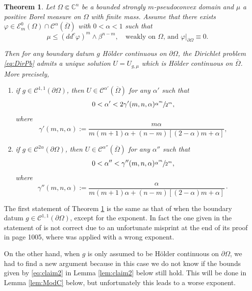\documentclass[11pt]{article}
\providecommand{\C}{}
\numberwithin{equation}{section}
\theoremstyle{definition}
\renewcommand{\C}{\mathbb{C}}
\theoremstyle{plain}
\newtheorem{theoremB}{Theorem}
\theoremstyle{definition}
\begin{document}
\begin{theoremB}\label{th:B'}
Let $\Omega \Subset \C^n$ be a bounded strongly $m$-pseudoconvex domain and $\mu $ a positive Borel measure on $\Omega$ with finite mass. Assume that there exists \hbox{$\varphi\in \mathcal{E}^0_m(\Omega)\cap\mathcal{C}^{\alpha}(\overline\Omega)$} with $0 < \alpha < 1$ such that
\begin{equation} \label{eq:subsol}
\mu \leq (dd^c\varphi)^m\wedge\beta^{n-m}, \quad \text{weakly on $\Omega$, and $\varphi|_{\partial \Omega} \equiv 0$.}
\end{equation}

Then for any boundary datum $g $ Hölder continuous on $\partial \Omega$, the Dirichlet problem \eqref{eq:DirPb} admits a unique solution $U = U_{g,\mu} $ which is Hölder continuous on $\bar{\Omega}$.
More precisely,
\begin{enumerate}
\item
if $g \in \mathcal C^{1,1} (\partial \Omega)$, then $ U \in \mathcal{C}^{\alpha'}(\overline\Omega)$ for any $\alpha'$ such that
\[
0 < \alpha' < 2 \gamma' (m,n,\alpha) \sfrac{\alpha^m}{2^{m}},
\]
where
\begin{equation} \label{eq:gamma'}
\gamma' (m,n,\alpha) := \frac{ m \alpha}{ m (m + 1) \alpha + (n-m) [(2 - \alpha)m + \alpha]},
\end{equation}

\item
if $g \in \mathcal C^{2 \alpha} (\partial \Omega)$, then $ U \in \mathcal{C}^{\alpha''}(\overline\Omega)$ for any $\alpha''$ such that
\[
0 < \alpha'' < \gamma'' (m,n,\alpha) \sfrac{\alpha^m}{2^{m}},
\]
where
\begin{equation} \label{eq:gamma''}
\gamma'' (m,n,\alpha) := \frac{\alpha}{ m (m + 1) \alpha + (n-m) [(2 - \alpha)m + \alpha]}\cdot
\end{equation}
\end{enumerate}
\end{theoremB}

The first statement of Theorem \ref{th:B'} is the same as that of \cite[Th.\,B]{BZ20} when the boundary datum $g \in \mathcal C^{1,1} (\partial \Omega)$, except for the exponent.
In fact the one given in the statement of \cite[Th.\,B]{BZ20} is not correct due to an unfortunate misprint at the end of its proof in page 1005, where \cite[Prop.\,2.20]{BZ20} was applied with a wrong exponent.

On the other hand, when $g$ is only assumed to be Hölder continuous on $\partial \Omega$, we had to find a new argument because in this case we do not know if the bounds given by \eqref{eq:claim2} in Lemma \ref{lem:claim2} below still hold. This will be done in Lemma \ref{lem:ModC} below, but unfortunately this leads to a worse exponent.
\end{document}
